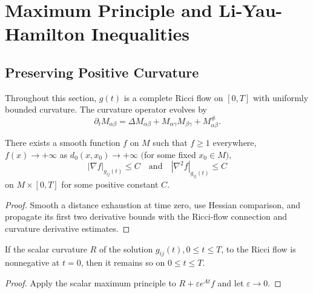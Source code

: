 \chapter{Maximum Principle and Li-Yau-Hamilton Inequalities}
\label{chap:cz-maximum-principles}

\section{Preserving Positive Curvature}

Throughout this section, $g(t)$ is a complete Ricci flow on $[0,T]$
with uniformly bounded curvature.  The curvature operator evolves by
\[
\partial_t M_{\alpha\beta}=\Delta M_{\alpha\beta}
+M_{\alpha\gamma}M_{\beta\gamma}+M_{\alpha\beta}^{\#}.
\]

\begin{lemma}
  \label{lem:cz-proper-exhaustion-with-uniformly-bounded-derivatives}
There exists a smooth function $f$ on $M$ such that $f\ge 1$
everywhere, $f(x)\rightarrow +\infty$ as $d_0(x,x_0)\rightarrow
+\infty$ $($for some fixed $x_0\in M),$
$$
|\nabla f|_{g_{ij}(t)}\le C \quad \text{and}\quad |\nabla^2
f|_{g_{ij}(t)}\le C
$$
on $M \times [0,T]$ for some positive constant $C$.
\end{lemma}

\begin{proof}
  \sketch Smooth a distance exhaustion at time zero, use Hessian comparison, and propagate its first two derivative bounds with the Ricci-flow connection and curvature derivative estimates.
\end{proof}

\begin{proposition}
  \label{prop:cz-preservation-of-nonnegative-scalar-curvature}
If the scalar curvature $R$ of the solution $g_{ij}(t), 0\le t\le
T$, to the Ricci flow is nonnegative at $t=0$, then it remains so
on $0\le t\le T$.
\end{proposition}

\begin{proof}
  \sketch Apply the scalar maximum principle to $R+\varepsilon e^{At}f$ and let $\varepsilon\to0$.
\end{proof}

